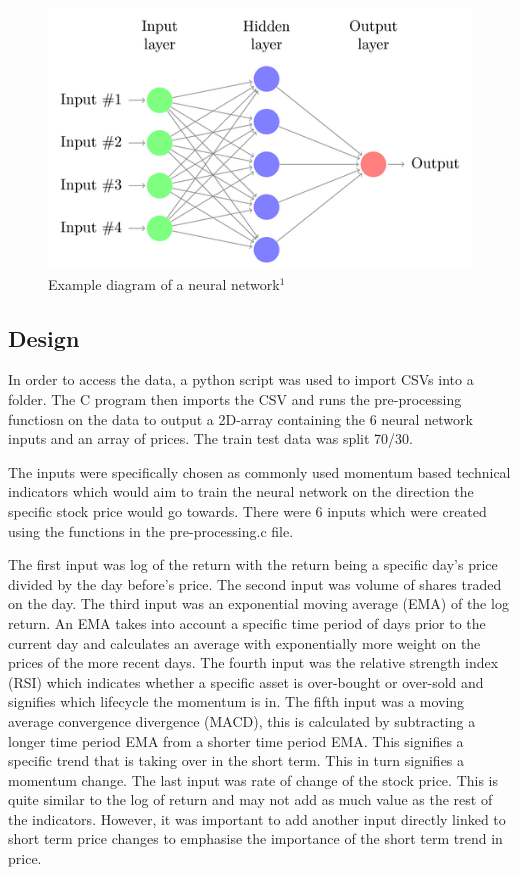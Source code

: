 \documentclass[11pt]{article}
\begin{document}
\begin{figure}[h]
\includegraphics[scale=0.8]{neural-network}
\caption{Example diagram of a neural network$^1$}
\end{figure}

\subsection{Design}
In order to access the data, a python script was used to import CSVs into a folder. The C program then imports the CSV and runs the pre-processing functiosn on the data to output a 2D-array containing the 6 neural network inputs and an array of prices. The train test data was split 70/30.

The inputs were specifically chosen as commonly used momentum based technical indicators which would aim to train the neural network on the direction the specific stock price would go towards. There were 6 inputs which were created using the functions in the pre-processing.c file. 

The first input was log of the return with the return being a specific day's price divided by the day before's price. The second input was volume of shares traded on the day. The third input was an exponential moving average (EMA) of the log return. An EMA takes into account a specific time period of days prior to the current day and calculates an average with exponentially more weight on the prices of the more recent days. The fourth input was the relative strength index (RSI) which indicates whether a specific asset is over-bought or over-sold and signifies which lifecycle the momentum is in. The fifth input was a moving average convergence divergence (MACD), this is calculated by subtracting a longer time period EMA from a shorter time period EMA. This signifies a specific trend that is taking over in the short term. This in turn signifies a momentum change. The last input was rate of change of the stock price. This is quite similar to the log of return and may not add as much value as the rest of the indicators. However, it was important to add another input directly linked to short term price changes to emphasise the importance of the short term trend in price.
\end{document}

